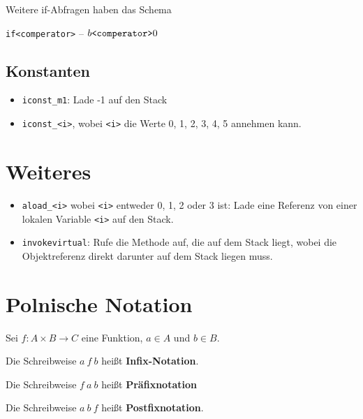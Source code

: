 Weitere if-Abfragen haben das Schema

\begin{center}
    \texttt{if<comperator>} -- $b \text{\texttt{<comperator>}} 0$
\end{center}

\subsection{Konstanten}%
\begin{itemize}
    \item \texttt{iconst\_m1}: Lade -1 auf den Stack
    \item \texttt{iconst\_<i>}, wobei \texttt{<i>} die Werte 0, 1, 2, 3, 4, 5
          annehmen kann.
\end{itemize}


\section{Weiteres}
\begin{itemize}
    \item \texttt{aload\_<i>} wobei \texttt{<i>} entweder 0, 1, 2 oder 3 ist: Lade eine
          Referenz von einer lokalen Variable \texttt{<i>} auf den Stack.
    \item \texttt{invokevirtual}: Rufe die Methode auf, die auf dem Stack liegt,
          wobei die Objektreferenz direkt darunter auf dem Stack liegen muss.
\end{itemize}

\section{Polnische Notation}
\begin{definition}
    Sei $f: A \times B \rightarrow C$ eine Funktion, $a \in A$ und $b \in B$.

    \begin{defenum}
        \item Die Schreibweise $a\ f\ b$ heißt \textbf{Infix-Notation}.
        \item Die Schreibweise $f\ a\ b$ heißt \textbf{Präfixnotation}
        \item Die Schreibweise $a\ b\ f$ heißt \textbf{Postfixnotation}.
    \end{defenum}
\end{definition}

